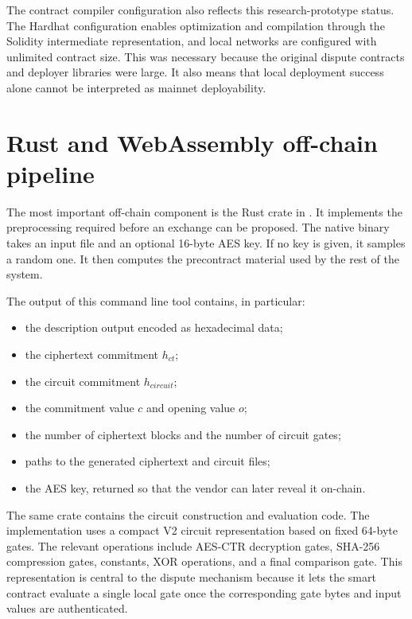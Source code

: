 The contract compiler configuration also reflects this research-prototype status. The
Hardhat configuration enables optimization and compilation through the Solidity intermediate
representation, and local networks are configured with unlimited contract size. This was
necessary because the original dispute contracts and deployer libraries were large. It also
means that local deployment success alone cannot be interpreted as mainnet deployability.

\section{Rust and WebAssembly off-chain pipeline}

The most important off-chain component is the Rust crate in . It implements
the preprocessing required before an exchange can be proposed. The native binary
 takes an input file and an optional 16-byte AES key. If no key is
given, it samples a random one. It then computes the precontract material used by the rest of
the system.

The output of this command line tool contains, in particular:

\begin{itemize}
  \item the description output encoded as hexadecimal data;
  \item the ciphertext commitment \(h_{ct}\);
  \item the circuit commitment \(h_{circuit}\);
  \item the commitment value \(c\) and opening value \(o\);
  \item the number of ciphertext blocks and the number of circuit gates;
  \item paths to the generated ciphertext and circuit files;
  \item the AES key, returned so that the vendor can later reveal it on-chain.
\end{itemize}

The same crate contains the circuit construction and evaluation code. The implementation uses
a compact V2 circuit representation based on fixed 64-byte gates. The relevant operations
include AES-CTR decryption gates, SHA-256 compression gates, constants, XOR operations, and a
final comparison gate. This representation is central to the dispute mechanism because it
lets the smart contract evaluate a single local gate once the corresponding gate bytes and
input values are authenticated.

